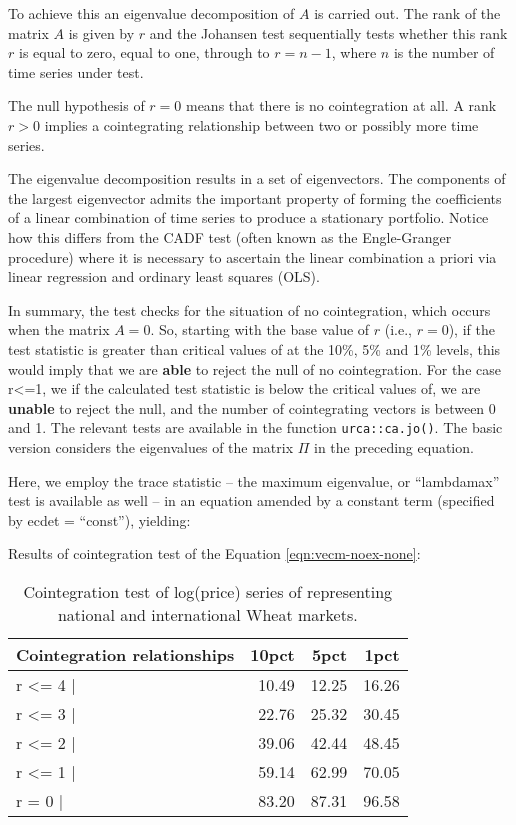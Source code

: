 \documentclass[
  12pt,
]{article}
\begin{document}
To achieve this an eigenvalue decomposition of \(A\) is carried out. The rank of the matrix \(A\) is given by \(r\) and the Johansen test sequentially tests whether this rank \(r\) is equal to zero, equal to one, through to \(r=n-1\), where \(n\) is the number of time series under test.

The null hypothesis of \(r=0\) means that there is no cointegration at all. A rank \(r > 0\) implies a cointegrating relationship between two or possibly more time series.

The eigenvalue decomposition results in a set of eigenvectors. The components of the largest eigenvector admits the important property of forming the coefficients of a linear combination of time series to produce a stationary portfolio. Notice how this differs from the CADF test (often known as the Engle-Granger procedure) where it is necessary to ascertain the linear combination a priori via linear regression and ordinary least squares (OLS).

In summary, the test checks for the situation of no cointegration, which occurs when the matrix \(A=0\). So, starting with the base value of \(r\) (i.e., \(r=0\)), if the test statistic is greater than critical values of at the 10\%, 5\% and 1\% levels, this would imply that we are \textbf{able} to reject the null of no cointegration. For the case r\textless=1, we if the calculated test statistic is below the critical values of, we are \textbf{unable} to reject the null, and the number of cointegrating vectors is between 0 and 1. The relevant tests are available in the function \texttt{urca::ca.jo()}. The basic version considers the eigenvalues of the matrix \(\Pi\) in the preceding equation.

Here, we employ the trace statistic -- the maximum eigenvalue, or ``lambdamax'' test is available as well -- in an equation amended by a constant term (specified by ecdet = ``const''), yielding:

Results of cointegration test of the Equation \ref{eqn:vecm-noex-none}:

\begin{table}

\caption{\label{tab:wheat-cajo-test}Cointegration test of log(price) series of representing national and international Wheat markets.}
\centering
\begin{tabular}[t]{lrrr}
\toprule
Cointegration relationships & 10pct & 5pct & 1pct\\
\midrule
r <= 4 | & 10.49 & 12.25 & 16.26\\
r <= 3 | & 22.76 & 25.32 & 30.45\\
r <= 2 | & 39.06 & 42.44 & 48.45\\
r <= 1 | & 59.14 & 62.99 & 70.05\\
r = 0  | & 83.20 & 87.31 & 96.58\\
\bottomrule
\end{tabular}
\end{table}
\end{document}
